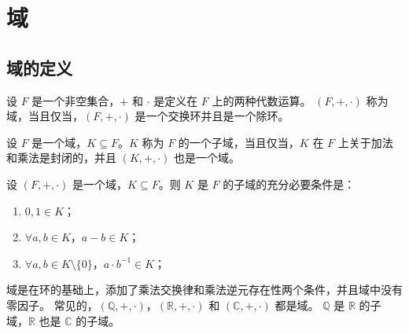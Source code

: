 \section{域}

\subsection{域的定义}
\begin{definition}[域 Field]
    设 $F$ 是一个非空集合，$+$ 和 $\cdot$ 是定义在 $F$ 上的两种代数运算。
    $ (F,+,\cdot) $ 称为域，当且仅当，$(F,+,\cdot)$ 是一个交换环并且是一个除环。
    \label{def:field}
\end{definition}

\begin{definition}[子域 Subfield]
    设 $F$ 是一个域，$K \subseteq F$。$K$ 称为 $F$ 的一个子域，当且仅当，$K$ 在 $F$ 上关于加法和乘法是封闭的，并且 $(K,+,\cdot)$ 也是一个域。
    \label{def:subfield}
\end{definition}

\begin{theorem}[子域判定定理]
    设 $(F,+,\cdot)$ 是一个域，$K \subseteq F$。则 $K$ 是 $F$ 的子域的充分必要条件是：
    \begin{enumerate}
        \item $0,1\in K$；
        \item $\forall a,b\in K$，$a-b\in K$；
        \item $\forall a,b\in K\setminus\{0\}$，$a\cdot b^{-1} \in K$；
    \end{enumerate}
\end{theorem}

\begin{note}
    域是在环的基础上，添加了乘法交换律和乘法逆元存在性两个条件，并且域中没有零因子。
    常见的，$(\mathbb{Q},+,\cdot)$，$(\mathbb{R},+,\cdot)$ 和 $(\mathbb{C},+,\cdot)$ 都是域。
    $\mathbb{Q}$ 是 $\mathbb{R}$ 的子域，$\mathbb{R}$ 也是 $\mathbb{C}$ 的子域。
\end{note}



